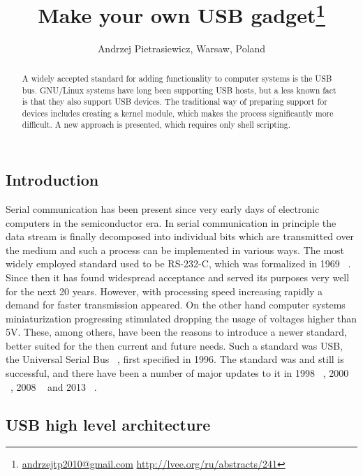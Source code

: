 \documentclass[10pt, a5paper]{article}
\begin{document}
\title{Make your own USB gadget\footnote{\url{andrzejtp2010@gmail.com} \url{http://lvee.org/ru/abstracts/241}}}
\author{Andrzej Pietrasiewicz, Warsaw, Poland}
\maketitle
\begin{abstract}
A widely accepted standard for adding functionality to computer systems is the USB bus. GNU/Linux systems have long been supporting USB hosts, but a less known fact is that they also support USB devices. The traditional way of preparing support for devices includes creating a kernel module, which makes the process significantly more difficult. A new approach is presented, which requires only shell scripting.
\end{abstract}
\subsection*{Introduction}

Serial communication has been present since very early days of electronic computers in the semiconductor era. In serial communication in principle the data stream is finally decomposed into individual bits which are transmitted over the medium and such a process can be implemented in various ways. The most widely employed standard used to be RS-232-C, which was formalized in 1969 ~\cite{Pietrasiewicz1}. Since then it has found widespread acceptance and served its purposes very well for the next 20  years. However, with processing speed increasing rapidly a demand for faster transmission appeared. On the other hand computer systems miniaturization progressing stimulated dropping the usage of voltages higher than 5V. These, among others, have been the reasons to introduce a newer standard, better suited for the then current and future needs. Such a standard was USB, the Universal Serial Bus ~\cite{Pietrasiewicz2}, first specified in 1996. The standard was and still is successful, and there have been a number of major updates to it in 1998 ~\cite{Pietrasiewicz3}, 2000 ~\cite{Pietrasiewicz4}, 2008 ~\cite{Pietrasiewicz5} and 2013 ~\cite{Pietrasiewicz6}.

\subsection*{USB high level architecture}
\end{document}
